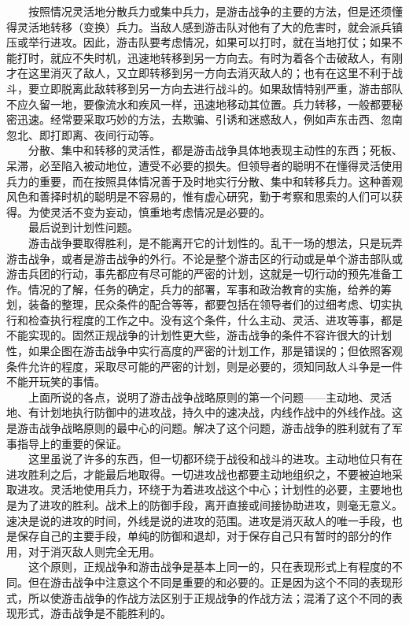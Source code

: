 \documentclass[cn,11pt,chinese]{elegantbook}
\begin{document}
　　按照情况灵活地分散兵力或集中兵力，是游击战争的主要的方法，但是还须懂得灵活地转移（变换）兵力。当敌人感到游击队对他有了大的危害时，就会派兵镇压或举行进攻。因此，游击队要考虑情况，如果可以打时，就在当地打仗；如果不能打时，就应不失时机，迅速地转移到另一方向去。有时为着各个击破敌人，有刚才在这里消灭了敌人，又立即转移到另一方向去消灭敌人的；也有在这里不利于战斗，要立即脱离此敌转移到另一方向去进行战斗的。如果敌情特别严重，游击部队不应久留一地，要像流水和疾风一样，迅速地移动其位置。兵力转移，一般都要秘密迅速。经常要采取巧妙的方法，去欺骗、引诱和迷惑敌人，例如声东击西、忽南忽北、即打即离、夜间行动等。\\
　　分散、集中和转移的灵活性，都是游击战争具体地表现主动性的东西；死板、呆滞，必至陷入被动地位，遭受不必要的损失。但领导者的聪明不在懂得灵活使用兵力的重要，而在按照具体情况善于及时地实行分散、集中和转移兵力。这种善观风色和善择时机的聪明是不容易的，惟有虚心研究，勤于考察和思索的人们可以获得。为使灵活不变为妄动，慎重地考虑情况是必要的。\\
　　最后说到计划性问题。\\
　　游击战争要取得胜利，是不能离开它的计划性的。乱干一场的想法，只是玩弄游击战争，或者是游击战争的外行。不论是整个游击区的行动或是单个游击部队或游击兵团的行动，事先都应有尽可能的严密的计划，这就是一切行动的预先准备工作。情况的了解，任务的确定，兵力的部署，军事和政治教育的实施，给养的筹划，装备的整理，民众条件的配合等等，都要包括在领导者们的过细考虑、切实执行和检查执行程度的工作之中。没有这个条件，什么主动、灵活、进攻等事，都是不能实现的。固然正规战争的计划性更大些，游击战争的条件不容许很大的计划性，如果企图在游击战争中实行高度的严密的计划工作，那是错误的；但依照客观条件允许的程度，采取尽可能的严密的计划，则是必要的，须知同敌人斗争是一件不能开玩笑的事情。\\
　　上面所说的各点，说明了游击战争战略原则的第一个问题——主动地、灵活地、有计划地执行防御中的进攻战，持久中的速决战，内线作战中的外线作战。这是游击战争战略原则的最中心的问题。解决了这个问题，游击战争的胜利就有了军事指导上的重要的保证。\\
　　这里虽说了许多的东西，但一切都环绕于战役和战斗的进攻。主动地位只有在进攻胜利之后，才能最后地取得。一切进攻战也都要主动地组织之，不要被迫地采取进攻。灵活地使用兵力，环绕于为着进攻战这个中心；计划性的必要，主要地也是为了进攻的胜利。战术上的防御手段，离开直接或间接协助进攻，则毫无意义。速决是说的进攻的时间，外线是说的进攻的范围。进攻是消灭敌人的唯一手段，也是保存自己的主要手段，单纯的防御和退却，对于保存自己只有暂时的部分的作用，对于消灭敌人则完全无用。\\
　　这个原则，正规战争和游击战争是基本上同一的，只在表现形式上有程度的不同。但在游击战争中注意这个不同是重要的和必要的。正是因为这个不同的表现形式，所以使游击战争的作战方法区别于正规战争的作战方法；混淆了这个不同的表现形式，游击战争是不能胜利的。\\
\end{document}
